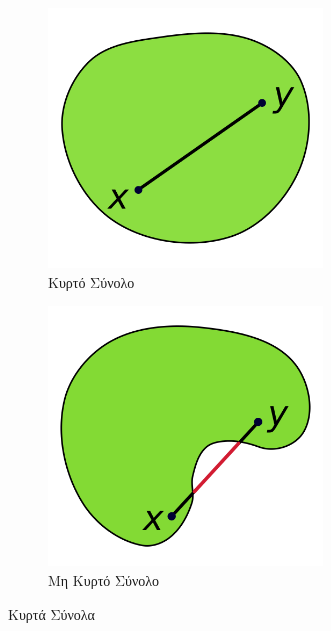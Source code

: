 \begin{figure}
    \centering
    \begin{subfigure}[b]{.4\textwidth}
        \centering
        \includegraphics[width=0.8\textwidth]{figures/Convex_polygon_illustration1.png}
        \caption{Κυρτό Σύνολο}
        \label{fig:eg_convex_set}
    \end{subfigure}
    \hfill
    \begin{subfigure}[b]{.4\textwidth}
        \centering
        \includegraphics[width=0.8\textwidth]{figures/Convex_polygon_illustration2.png}
        \caption{Μη Κυρτό Σύνολο}
        \label{fig:eg_nonconvex_set}
    \end{subfigure}
    \caption{Κυρτά Σύνολα}
\end{figure}
